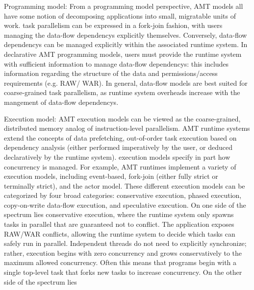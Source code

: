 \begin{compactdesc}
\item[Programming model:]
From a \gls{programming model} perspective,
\gls{AMT} models all have some notion of decomposing applications into small,
\gls{migratable} units of work. 
\Gls{task parallelism} can be expressed in a \gls{fork-join}
fashion, with users managing the \glspl{data-flow dependency} explicitly
themselves.  Conversely, \glspl{data-flow dependency} can be managed explicitly within the associated \gls{runtime system}. 
  In \gls{declarative} \gls{AMT} \glspl{programming model}, users must provide
  the \gls{runtime system} with sufficient information to manage
  \glspl{data-flow dependency}: this includes information regarding the
  structure of the data and permissions/access requirements (e.g. \gls{RAW}/
  \gls{WAR}).  In general, data-flow models are best suited for coarse-grained \gls{task
parallelism}, as \gls{runtime system} overheads increase with the mangement of
\glspl{data-flow dependency}.  
\item[Execution model:]
  \gls{AMT} \glspl{execution model} can be viewed as the coarse-grained,
  distributed memory analog of instruction-level parallelism. 
  \gls{AMT} \glspl{runtime system} extend the concepts of \gls{data
  prefetching}, out-of-order task execution based on dependency analysis (either performed
    imperatively by the user, or deduced declaratively by the \gls{runtime
    system}).     \Glspl{execution model} specify in part how \gls{concurrency} is
    managed. For example, \gls{AMT} runtimes implement a variety of
    \glspl{execution model}, including \gls{event-based}, \gls{fork-join} (either
    \gls{fully strict} or \gls{terminally strict}), and the \gls{actor
    model}. These different \glspl{execution model} can be categorized by four broad
    categories: \gls{conservative execution}, \gls{phased execution}, 
    \gls{copy-on-write data-flow execution}, and \gls{speculative execution}.
    On one side of the spectrum lies \gls{conservative execution}, where the \gls{runtime system} only spawns tasks in parallel 
    that are guaranteed not to conflict.  The application exposes \gls{RAW}/\gls{WAR} conflicts, allowing the
    \gls{runtime system} to decide which tasks can safely run in parallel.  Independent threads do not need to explicitly synchronize; 
    rather, execution begins with zero \gls{concurrency} and grows conservatively to the maximum allowed \gls{concurrency}.
    Often this means that programs begin with a single top-level task that forks new tasks 
    to increase \gls{concurrency}.  On the other side of the spectrum lies

\end{compactdesc}
